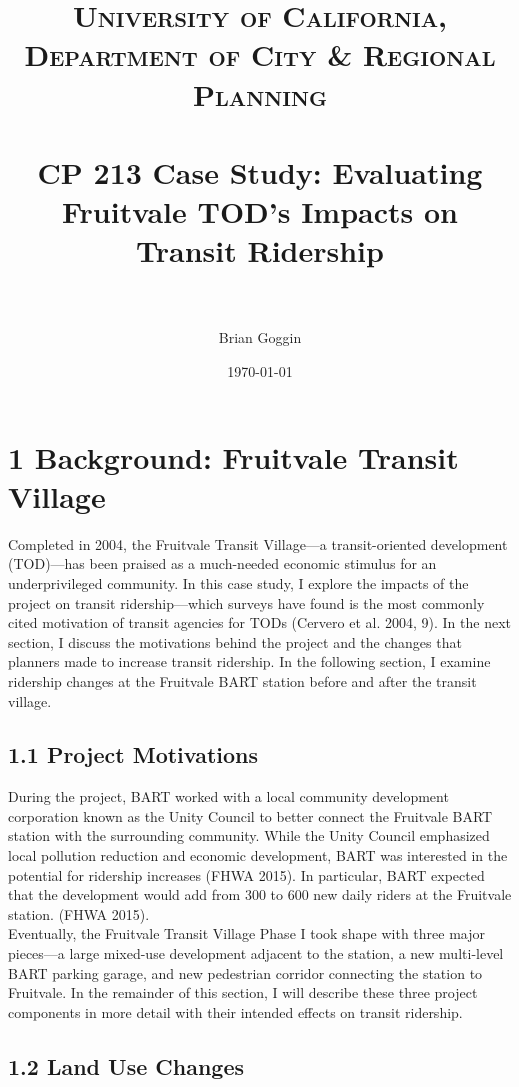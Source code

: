\documentclass{article}
\title{	
\normalfont \normalsize 
\textsc{University of California, Department of City \& Regional Planning} \\ [25pt] %
\horrule{0.5pt} \\[0.4cm] %
\huge CP 213 Case Study: Evaluating Fruitvale TOD's Impacts on Transit Ridership \\ %
\horrule{2pt} \\[0.5cm] %
}
\author{Brian Goggin} %
\date{\normalsize\today} %
\begin{document}
\maketitle %
\newpage



\section*{1 Background: Fruitvale Transit Village}

Completed in 2004, the Fruitvale Transit Village---a transit-oriented development (TOD)---has been praised as a much-needed economic stimulus for an underprivileged community. In this case study, I explore the impacts of the project on transit ridership---which surveys have found is the most commonly cited motivation of transit agencies for TODs (Cervero et al. 2004, 9). In the next section, I discuss the motivations behind the project and the changes that planners made to increase transit ridership. In the following section, I examine ridership changes at the Fruitvale BART station before and after the transit village. 

\subsection*{1.1 Project  Motivations}

During the project, BART worked with a local community development corporation known as the Unity Council to better connect the Fruitvale BART station with the surrounding community. While the Unity Council emphasized local pollution reduction and economic development, BART was interested in the potential for ridership increases (FHWA 2015). In particular, BART expected that the development would add from 300 to 600 new daily riders at the Fruitvale station. (FHWA 2015).  \\

\noindent
Eventually, the Fruitvale Transit Village Phase I took shape with three major pieces---a large mixed-use development adjacent to the station, a new multi-level BART parking garage, and new pedestrian corridor connecting the station to Fruitvale. In the remainder of this section, I will describe these three project components in more detail with their intended effects on transit ridership. \\

\subsection*{1.2 Land Use Changes}
\end{document}
